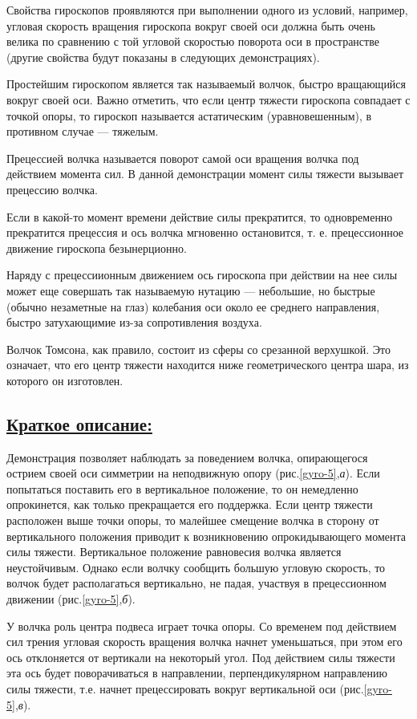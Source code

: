 \documentclass[14pt,a4paper,oneside]{extarticle}	%
\begin{document}
Свойства гироскопов проявляются при выполнении одного из условий, например, угловая скорость вращения гироскопа вокруг своей оси должна быть очень велика по сравнению с той угловой скоростью поворота оси в пространстве (другие свойства будут показаны в следующих демонстрациях).
	
Простейшим гироскопом является так называемый волчок, быстро вращающийся вокруг своей оси.  
Важно отметить, что если центр тяжести гироскопа совпадает с точкой опоры, то гироскоп называется астатическим (уравновешенным), 
в противном случае — тяжелым.

Прецессией волчка называется поворот самой оси вращения волчка под действием момента сил. В данной демонстрации момент силы тяжести вызывает прецессию волчка.

Если в какой-то момент времени действие силы прекратится, то одновременно прекратится прецессия и ось 
волчка мгновенно остановится, т. е. прецессионное движение гироскопа безынерционно.

Наряду с прецессиионным движением ось гироскопа при действии на нее силы может еще совершать так называемую нутацию — небольшие, 
но быстрые (обычно незаметные на глаз) колебания оси около ее среднего направления, быстро затухающимие из-за сопротивления воздуха.

Волчок Томсона, как правило, состоит из сферы со срезанной верхушкой. 
Это означает, что его центр тяжести находится ниже геометрического центра шара, из которого он изготовлен. 

\newpage
	\subsection*{\underline{Краткое описание:}}
	
	Демонстрация позволяет наблюдать за поведением волчка, опирающегося острием своей оси симметрии на неподвижную опору (рис.\ref{gyro-5},\textit{а}).
	Если попытаться поставить его в вертикальное положение, то он немедленно опрокинется, как только прекращается его поддержка. 
	Если центр тяжести расположен выше точки опоры, то малейшее смещение волчка в сторону от вертикального положения приводит к возникновению опрокидывающего момента силы тяжести.
	Вертикальное положение равновесия волчка является неустойчивым.
	Однако если волчку сообщить большую угловую скорость, то волчок будет располагаться вертикально, не падая, участвуя в прецессионном движении (рис.\ref{gyro-5},\textit{б}). 

У волчка роль центра подвеса играет точка опоры.
Со временем под действием сил трения угловая скорость вращения волчка начнет уменьшаться, при этом его ось отклоняется от вертикали на некоторый угол.
Под действием силы тяжести эта ось будет поворачиваться в направлении, перпендикулярном направлению силы тяжести, т.е. начнет прецессировать вокруг вертикальной оси (рис.\ref{gyro-5},\textit{в}).
\end{document}
